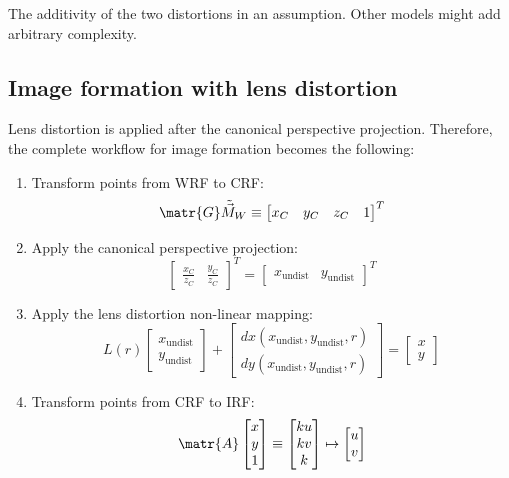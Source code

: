 \begin{remark}
    The additivity of the two distortions in an assumption.
    Other models might add arbitrary complexity.
\end{remark}


\subsection{Image formation with lens distortion}

Lens distortion is applied after the canonical perspective projection.
Therefore, the complete workflow for image formation becomes the following:
\begin{enumerate}
    \item Transform points from WRF to CRF:
        \[ \matr{G} \tilde{\vec{M}}_W \equiv \begin{bmatrix} x_C & y_C & z_C & 1 \end{bmatrix}^T \]
    \item Apply the canonical perspective projection:
        \[ 
            \begin{bmatrix} \frac{x_C}{z_C} & \frac{y_C}{z_C} \end{bmatrix}^T =
            \begin{bmatrix} x_\text{undist} & y_\text{undist} \end{bmatrix}^T
        \]
    \item Apply the lens distortion non-linear mapping:
        \[ 
            L(r) \begin{bmatrix} x_\text{undist} \\ y_\text{undist} \end{bmatrix} +
            \begin{bmatrix} dx(x_\text{undist}, y_\text{undist}, r) \\ dy(x_\text{undist}, y_\text{undist}, r) \end{bmatrix} =
            \begin{bmatrix} x \\ y \end{bmatrix}
        \]
    \item Transform points from CRF to IRF:
        \[
            \matr{A} \begin{bmatrix} x \\ y \\ 1 \end{bmatrix} \equiv
            \begin{bmatrix} ku \\ kv \\ k \end{bmatrix} \mapsto
            \begin{bmatrix} u \\ v \end{bmatrix}
        \]
\end{enumerate}



